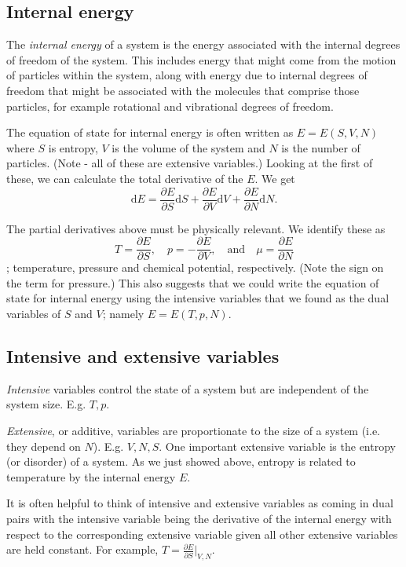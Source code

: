 \subsection{Internal energy}
The \emph{internal energy} of a system is the energy associated with the internal degrees of freedom of the system. This includes energy that might come from the motion of particles within the system, along with energy due to internal degrees of freedom that might be associated with the molecules that comprise those particles, for example rotational and vibrational degrees of freedom. 

The equation of state for internal energy is often written as $E = E(S,V,N)$ where $S$ is entropy, $V$ is the volume of the system and $N$ is the number of particles. (Note - all of these are extensive variables.)
Looking at the first of these, we can calculate the total derivative of the $E$. We get
$$
	\mathrm{d}E = \frac{\partial E}{\partial S}\mathrm{d}S +  \frac{\partial E}{\partial V}\mathrm{d}V +  \frac{\partial E}{\partial N}\mathrm{d}N.  
$$

The partial derivatives above must be physically relevant. We identify these as 
$$T =  \frac{\partial E}{\partial S}, \quad p = -\frac{\partial E}{\partial V},\quad \mbox{and}  \quad \mu = \frac{\partial E}{\partial N}$$; 
temperature, pressure and chemical potential, respectively. (Note the sign on the term for pressure.) This also suggests that we could write the equation of state for internal energy using the intensive variables that we found as the dual variables of $S$ and $V$; namely $E = E(T,p,N)$.

\subsection{Intensive and extensive variables}

\emph{Intensive} variables control the state of a system but are independent of the system size. E.g. $T,p$.

\emph{Extensive}, or additive, variables are proportionate to the size of a system (i.e. they depend on $N$). E.g. $V,N,S$.
One important extensive variable is the entropy (or disorder) of a system. As we just showed above, entropy is related to temperature by the internal energy $E$.

It is often helpful to think of intensive and extensive variables as coming in dual pairs with the intensive variable being the derivative of the internal energy with respect to the corresponding extensive variable given all other extensive variables are held constant. For example, $T = \frac{\partial E}{\partial S}\vert_{V,N}$.

